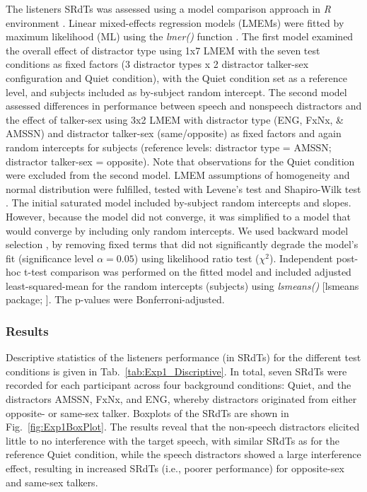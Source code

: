 \documentclass[a4paper, twoside]{templates/ociamthesis}
\begin{document}
\hfill\break
The listeners SRdTs was assessed using a model comparison approach in \emph{R} environment \autocite{RStudio}. Linear mixed-effects regression models (LMEMs) were fitted by maximum likelihood (ML) using the \textit{lmer()} function \autocite[\textit{lme4} package in][]{Bates2014}. The first model examined the overall effect of distractor type using 1x7 LMEM with the seven test conditions as fixed factors (3 distractor types x 2 distractor talker-sex configuration and Quiet condition), with the Quiet condition set as a reference level, and subjects included as by-subject random intercept. The second model assessed differences in performance between speech and nonspeech distractors and the effect of talker-sex using 3x2 LMEM with distractor type (ENG, FxNx, \& AMSSN) and distractor talker-sex (same/opposite) as fixed factors and again random intercepts for subjects (reference levels: distractor type = AMSSN; distractor talker-sex = opposite). Note that observations for the Quiet condition were excluded from the second model. LMEM assumptions of homogeneity and normal distribution were fulfilled, tested with Levene's test \autocite{Car_LevenTestRPackage} and Shapiro-Wilk test \autocite{Stats_ShapiroWilkRPackage}. The initial saturated model included by-subject random intercepts and slopes. However, because the model did not converge, it was simplified to a model that would converge by including only random intercepts. We used backward model selection \autocite[cf.][]{Barr2013}, by removing fixed terms that did not significantly degrade the model's fit (significance level \(\alpha =0.05\)) using likelihood ratio test (\(\chi^2\)). Independent post-hoc t-test comparison was performed on the fitted model and included adjusted least-squared-mean for the random intercepts (subjects) using \textit{lsmeans()} {[}lsmeans package; \textcite{Lenth2016}{]}. The p-values were Bonferroni-adjusted.\\

\hypertarget{results}{%
\subsubsection{Results}\label{results}}

Descriptive statistics of the listeners performance (in SRdTs) for the different test conditions is given in Tab.~\ref{tab:Exp1_Discriptive}. In total, seven SRdTs were recorded for each participant across four background conditions: Quiet, and the distractors AMSSN, FxNx, and ENG, whereby distractors originated from either opposite- or same-sex talker. Boxplots of the SRdTs are shown in Fig.~\ref{fig:Exp1BoxPlot}. The results reveal that the non-speech distractors elicited little to no interference with the target speech, with similar SRdTs as for the reference Quiet condition, while the speech distractors showed a large interference effect, resulting in increased SRdTs (i.e., poorer performance) for opposite-sex and same-sex talkers.\\
\end{document}
